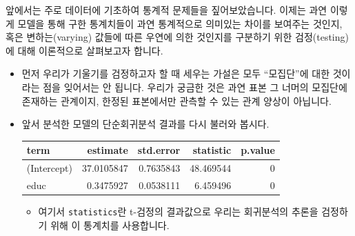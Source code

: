 \documentclass[]{book}
\newenvironment{Shaded}{\begin{snugshade}}{\end{snugshade}}
\newcommand{\KeywordTok}[1]{\textcolor[rgb]{0.13,0.29,0.53}{\textbf{#1}}}
\newcommand{\NormalTok}[1]{#1}
\newcommand{\OperatorTok}[1]{\textcolor[rgb]{0.81,0.36,0.00}{\textbf{#1}}}
\newcommand{\StringTok}[1]{\textcolor[rgb]{0.31,0.60,0.02}{#1}}
\begin{document}
앞에서는 주로 데이터에 기초하여 통계적 문제들을 짚어보았습니다. 이제는 과연 이렇게 모델을 통해 구한 통계치들이 과연 통계적으로 의미있는 차이를 보여주는 것인지, 혹은 변하는(varying) 값들에 따른 우연에 의한 것인지를 구분하기 위한 검정(testing)에 대해 이론적으로 살펴보고자 합니다.

\begin{itemize}
\item
  먼저 우리가 기울기를 검정하고자 할 때 세우는 가설은 모두 ``모집단''에 대한 것이라는 점을 잊어서는 안 됩니다. 우리가 궁금한 것은 과연 표본 그 너머의 모집단에 존재하는 관계이지, 한정된 표본에서만 관측할 수 있는 관계 양상이 아닙니다.
\item
  앞서 분석한 모델의 단순회귀분석 결과를 다시 불러와 봅시다.

\begin{Shaded}
\end{Shaded}

  \begin{tabular}{l|r|r|r|r}
  \hline
  term & estimate & std.error & statistic & p.value\\
  \hline
  (Intercept) & 37.0105847 & 0.7635843 & 48.469544 & 0\\
  \hline
  educ & 0.3475927 & 0.0538111 & 6.459496 & 0\\
  \hline
  \end{tabular}

  \begin{itemize}
  \item
    여기서 \texttt{statistics}란 t-검정의 결과값으로 우리는 회귀분석의 추론을 검정하기 위해 이 통계치를 사용합니다.


\end{itemize}
\end{itemize}
\end{document}
